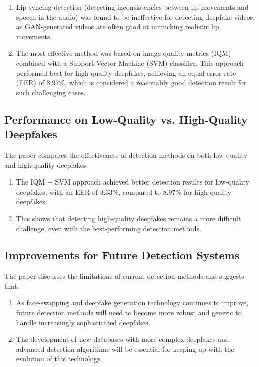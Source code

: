 \documentclass{report}
\begin{document}
	\begin{enumerate}
		\item 
		Lip-syncing detection (detecting inconsistencies between lip movements and speech in the audio) was found to be ineffective for detecting deepfake videos, as GAN-generated videos are often good at mimicking realistic lip movements.
		
		\item 
		The most effective method was based on image quality metrics (IQM) combined with a Support Vector Machine (SVM) classifier. This approach performed best for high-quality deepfakes, achieving an equal error rate (EER) of 8.97\%, which is considered a reasonably good detection result for such challenging cases.
	\end{enumerate}
	
	
	\subsection{Performance on Low-Quality vs. High-Quality Deepfakes}
	The paper compares the effectiveness of detection methods on both low-quality and high-quality deepfakes:
	
	\begin{enumerate}
		\item 
		The IQM + SVM approach achieved better detection results for low-quality deepfakes, with an EER of 3.33\%, compared to 8.97\% for high-quality deepfakes.
		
		\item 
		This shows that detecting high-quality deepfakes remains a more difficult challenge, even with the best-performing detection methods.
	\end{enumerate}
	
	
	\subsection{Improvements for Future Detection Systems}
	The paper discusses the limitations of current detection methods and suggests that:
	
	\begin{enumerate}
		\item 
		As face-swapping and deepfake generation technology continues to improve, future detection methods will need to become more robust and generic to handle increasingly sophisticated deepfakes.
		
		\item 
		The development of new databases with more complex deepfakes and advanced detection algorithms will be essential for keeping up with the evolution of this technology.
	\end{enumerate}
	
\end{document}

